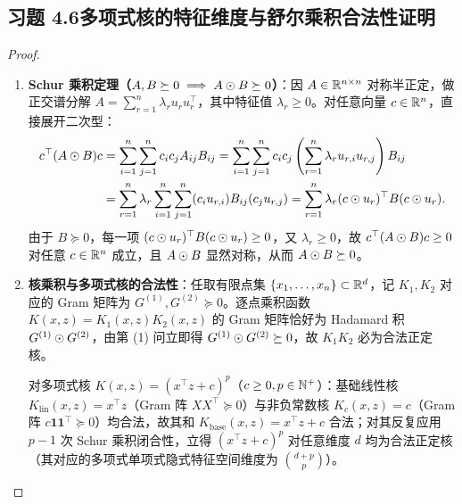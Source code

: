 \subsection*{习题 4.6\quad 多项式核的特征维度与舒尔乘积合法性证明}
\begin{proof}
\begin{enumerate}[label=(\arabic*), leftmargin=1.8em]
  \item \textbf{Schur 乘积定理（$A, B \succeq 0 \implies A \odot B \succeq 0$）}：因 $A \in \mathbb{R}^{n\times n}$ 对称半正定，做正交谱分解 $A = \sum_{r=1}^n \lambda_r u_r u_r^\top$，其中特征值 $\lambda_r \ge 0$。对任意向量 $c \in \mathbb{R}^n$，直接展开二次型：
  \begin{align*}
    c^\top (A \odot B) c
    &= \sum_{i=1}^n \sum_{j=1}^n c_i c_j A_{ij} B_{ij}
     = \sum_{i=1}^n \sum_{j=1}^n c_i c_j \left(\sum_{r=1}^n \lambda_r u_{r,i} u_{r,j}\right) B_{ij} \\
    &= \sum_{r=1}^n \lambda_r \sum_{i=1}^n \sum_{j=1}^n (c_i u_{r,i}) B_{ij} (c_j u_{r,j})
     = \sum_{r=1}^n \lambda_r (c \odot u_r)^\top B (c \odot u_r).
  \end{align*}
  由于 $B \succeq 0$，每一项 $(c \odot u_r)^\top B (c \odot u_r) \ge 0$，又 $\lambda_r \ge 0$，故 $c^\top (A \odot B) c \ge 0$ 对任意 $c \in \mathbb{R}^n$ 成立，且 $A \odot B$ 显然对称，从而 $A \odot B \succeq 0$。

  \item \textbf{核乘积与多项式核的合法性}：任取有限点集 $\{x_1, \dots, x_n\} \subset \mathbb{R}^d$，记 $K_1, K_2$ 对应的 Gram 矩阵为 $G^{(1)}, G^{(2)} \succeq 0$。逐点乘积函数 $K(x, z) = K_1(x, z) K_2(x, z)$ 的 Gram 矩阵恰好为 Hadamard 积 $G^{(1)} \odot G^{(2)}$，由第 (1) 问立即得 $G^{(1)} \odot G^{(2)} \succeq 0$，故 $K_1 K_2$ 必为合法正定核。

  对多项式核 $K(x, z) = (x^\top z + c)^p$（$c \ge 0, p \in \mathbb{N}^+$）：基础线性核 $K_{\mathrm{lin}}(x, z) = x^\top z$（Gram 阵 $XX^\top \succeq 0$）与非负常数核 $K_c(x, z) = c$（Gram 阵 $c\mathbf{1}\mathbf{1}^\top \succeq 0$）均合法，故其和 $K_{\mathrm{base}}(x, z) = x^\top z + c$ 合法；对其反复应用 $p - 1$ 次 Schur 乘积闭合性，立得 $(x^\top z + c)^p$ 对任意维度 $d$ 均为合法正定核（其对应的多项式单项式隐式特征空间维度为 $\binom{d + p}{p}$）。\qedhere
\end{enumerate}
\end{proof}

